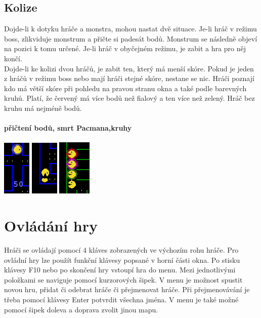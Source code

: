 \documentclass[10pt,a4paper]{article}
\begin{document}
\subsection{Kolize}
Dojde-li k dotyku hráče a monstra, mohou nastat dvě situace. Je-li hráč v režimu boss, zlikviduje monstrum a přičte si padesát bodů.
Monstrum se následně objeví na pozici k tomu určené. Je-li hráč v obyčejném režimu, je zabit a hra pro něj končí.
\\
Dojde-li ke kolizi dvou hráčů, je zabit ten, který má menší skóre. Pokud je jeden z hráčů v režimu boss nebo mají hráči stejné skóre, nestane se nic. Hráči poznají kdo má větší skóre při pohledu na pravou stranu okna a také podle barevných kruhů. Platí, že červený má více bodů než fialový a ten více než zelený. Hráč bez kruhu má nejméně bodů.
\paragraph{přičtení bodů, smrt Pacmana,kruhy}
\begin{center}
\includegraphics[scale=0.7]{images/plus_50.png}
\includegraphics[scale=0.7]{images/pac_death.png}
\includegraphics[scale=0.7]{images/party.png}
\end{center}
\section{Ovládání hry}
Hráči se ovládají pomocí 4 kláves zobrazených ve výchozím rohu hráče. Pro ovládní hry lze použít funkční klávesy popsané v horní části okna. Po stisku klávesy F10 nebo po skončení hry vstoupí hra do menu. Mezi jednotlivými položkami se naviguje pomocí kurzorových šipek.
V menu je možnost spustit novou hru, přidat či odebrat hráče či přejmenovat hráče. Při přejmenovávání je třeba pomocí klávesy Enter potvrdit všechna jména. V menu je také možné pomocí šipek doleva a doprava zvolit jinou mapu.
\pagebreak 
\end{document}
